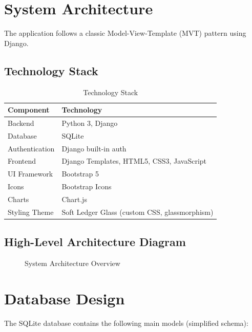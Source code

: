 \documentclass[12pt,a4paper]{article}
\begin{document}
\section{System Architecture}
The application follows a classic Model-View-Template (MVT) pattern using Django.

\subsection{Technology Stack}
\begin{table}[H]
\centering
\begin{tabular}{|l|l|}
\hline
\textbf{Component} & \textbf{Technology} \\ \hline
Backend & Python 3, Django \\ \hline
Database & SQLite \\ \hline
Authentication & Django built-in auth \\ \hline
Frontend & Django Templates, HTML5, CSS3, JavaScript \\ \hline
UI Framework & Bootstrap 5 \\ \hline
Icons & Bootstrap Icons \\ \hline
Charts & Chart.js \\ \hline
Styling Theme & Soft Ledger Glass (custom CSS, glassmorphism) \\ \hline
\end{tabular}
\caption{Technology Stack}
\end{table}

\subsection{High-Level Architecture Diagram}
\begin{figure}[H]
\centering
\caption{System Architecture Overview}
\end{figure}

\section{Database Design}
The SQLite database contains the following main models (simplified schema):
\end{document}
